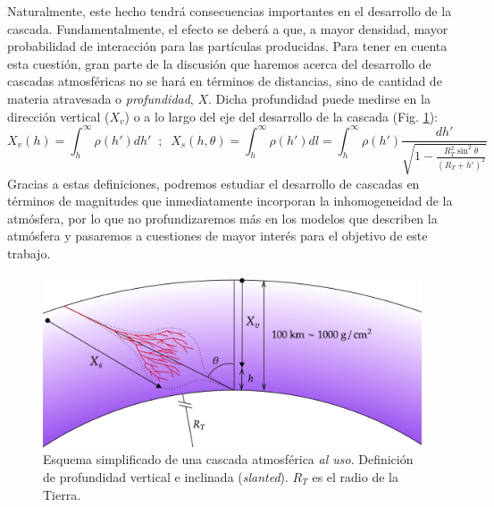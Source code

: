 \documentclass[12 pt, a4paper]{article} %
\numberwithin{equation}{section}
\numberwithin{figure}{section}
\numberwithin{table}{section}
\begin{document}
Naturalmente, este hecho tendrá consecuencias importantes en el desarrollo de la cascada. Fundamentalmente, el efecto se deberá a que, a mayor densidad, mayor probabilidad de interacción para las partículas producidas. Para tener en cuenta esta cuestión, gran parte de la discusión que haremos acerca del desarrollo de cascadas atmosféricas no se hará en términos de distancias, sino de cantidad de materia atravesada o \textit{profundidad}, $X$. Dicha profundidad puede medirse en la dirección vertical ($X_v$) o a lo largo del eje del desarrollo de la cascada (Fig. \ref{shower_params}):
\begin{equation}
	X_v(h)=\int_{h}^\infty\rho(h')dh'\;\;;\;\;X_s(h,\theta)=\int_{h}^\infty\rho(h')dl=\int_h^{\infty}\rho(h')\frac{dh'}{\sqrt{1-\frac{R_T^2\sin^2{\theta}}{\left(R_T+h'\right)^2}}}\label{ec22}
\end{equation}
Gracias a estas definiciones, podremos estudiar el desarrollo de cascadas en términos de magnitudes que inmediatamente incorporan la inhomogeneidad de la atmósfera, por lo que no profundizaremos más en los modelos que describen la atmósfera y pasaremos a cuestiones de mayor interés para el objetivo de este trabajo.

\begin{figure}[H]
	\centering
	\includegraphics[width=.7\linewidth]{figures/cascadas/shower_params}
	\caption{Esquema simplificado de una cascada atmosférica \textit{al uso}. Definición de profundidad vertical e inclinada (\textit{slanted}). $R_T$ es el radio de la Tierra.}
	\label{shower_params}
\end{figure}
\end{document}
